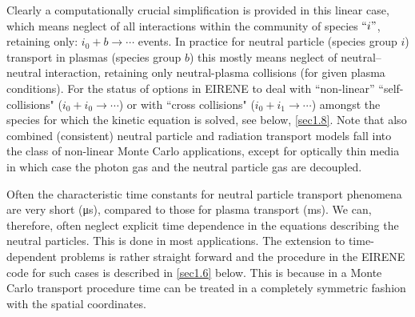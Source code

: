 Clearly a computationally crucial simplification is provided in this linear
case, which means neglect of all interactions within the community of species
$``i"$, retaining only: $i_0 + b \rightarrow \cdots$ events.
In practice for neutral particle (species group $i$) transport in plasmas
(species group $b$) this mostly means neglect of neutral--neutral interaction,
retaining only neutral-plasma collisions (for given plasma conditions).
For the status of options in EIRENE to deal with ``non-linear''
``self-collisions" ($i_0 + i_0 \rightarrow \cdots$)  or with ``cross
collisions" ($i_0 + i_1 \rightarrow \cdots$) amongst the species for which the
kinetic equation is solved, see below, \cref{sec1.8}.
Note that also combined (consistent) neutral particle and radiation transport
models fall into the class of non-linear Monte Carlo applications, except for
optically thin media in which case the photon gas and the neutral particle gas
are decoupled.


\vspace{1em}

Often the characteristic time constants for neutral particle transport
phenomena are very short (\si{\micro\second}), compared to those for plasma
transport (ms).
We can, therefore, often neglect explicit time dependence in the equations
describing the neutral particles.
This is done in most applications.
The extension to time-dependent problems is rather straight forward and the
procedure in the EIRENE code for such cases is described in \cref{sec1.6}
below.
This is because in a Monte Carlo transport procedure time can be treated in a
completely symmetric fashion with the spatial coordinates.


